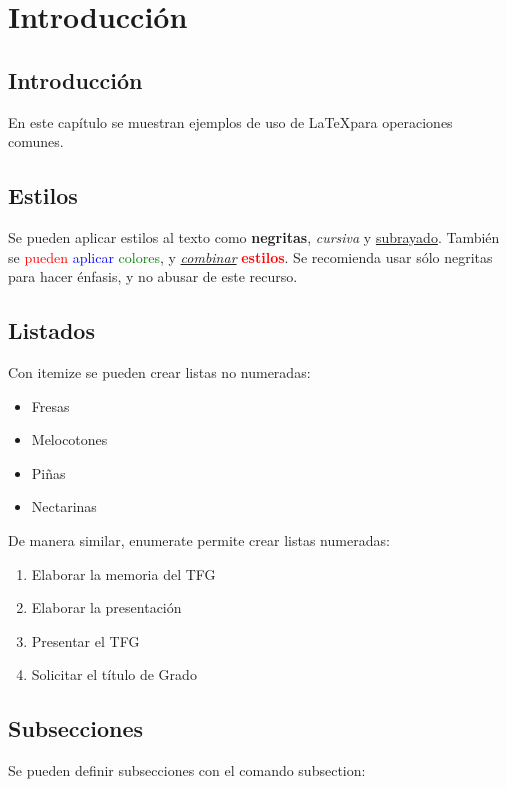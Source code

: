 \chapter{Introducción}\label{cap:ejemplos}


\section{Introducción}
En este capítulo se muestran ejemplos de uso de \LaTeX para operaciones comunes. 

\section{Estilos}\label{sec:estilos}
Se pueden aplicar estilos al texto como \textbf{negritas}, \textit{cursiva} y \underline{subrayado}. También se \textcolor{red}{pueden} \textcolor{blue}{aplicar} \textcolor{green}{colores}, y \underline{\textit{combinar}} \textbf{\textcolor{red}{estilos}}. Se recomienda usar sólo negritas para hacer énfasis, y no abusar de este recurso.

\section{Listados}
Con itemize se pueden crear listas no numeradas:

\begin{itemize}
    \item Fresas
    \item Melocotones
    \item Piñas
    \item Nectarinas
\end{itemize}

De manera similar, enumerate permite crear listas numeradas:

\begin{enumerate}
    \item Elaborar la memoria del TFG
    \item Elaborar la presentación
    \item Presentar el TFG
    \item Solicitar el título de Grado
\end{enumerate}

\section{Subsecciones}
Se pueden definir subsecciones con el comando subsection:

